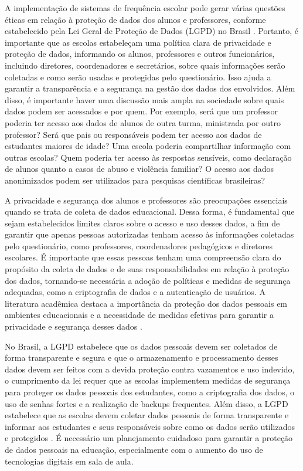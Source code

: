 A implementação de sistemas de frequência escolar pode gerar várias questões éticas em relação à proteção de dados dos alunos e professores, conforme estabelecido pela Lei Geral de Proteção de Dados (LGPD) no Brasil \cite{LGPD}. Portanto, é importante que as escolas estabeleçam uma política clara de privacidade e proteção de dados, informando os alunos, professores e outros funcionários, incluindo diretores, coordenadores e secretários, sobre quais informações serão coletadas e como serão usadas e protegidas pelo questionário. Isso ajuda a garantir a transparência e a segurança na gestão dos dados dos envolvidos. Além disso, é importante haver uma discussão mais ampla na sociedade sobre quais dados podem ser acessados e por quem. Por exemplo, será que um professor poderia ter acesso aos dados de alunos de outra turma, ministrada por outro professor? Será que pais ou responsáveis podem ter acesso aos dados de estudantes maiores de idade? Uma escola poderia compartilhar informação com outras escolas? Quem poderia ter acesso às respostas sensíveis, como declaração de alunos quanto a casos de abuso e violência familiar? O acesso aos dados anonimizados podem ser utilizados para pesquisas científicas brasileiras? 

A privacidade e segurança dos alunos e professores são preocupações essenciais quando se trata de coleta de dados educacional. Dessa forma, é fundamental que sejam estabelecidos limites claros sobre o acesso e uso desses dados, a fim de garantir que apenas pessoas autorizadas tenham acesso às informações coletadas pelo questionário, como professores, coordenadores pedagógicos e diretores escolares. É importante que essas pessoas tenham uma compreensão clara do propósito da coleta de dados e de suas responsabilidades em relação à proteção dos dados, tornando-se necessária a adoção de políticas e medidas de segurança adequadas, como a criptografia de dados e a autenticação de usuários. A literatura acadêmica destaca a importância da proteção dos dados pessoais em ambientes educacionais e a necessidade de medidas efetivas para garantir a privacidade e segurança desses dados \cite{Amo2021}. 

{No Brasil,} a LGPD estabelece que os dados pessoais devem ser coletados de forma transparente e segura e que o armazenamento e processamento desses dados devem ser feitos com a devida proteção contra vazamentos e uso indevido, o cumprimento da lei requer que as escolas implementem medidas de segurança para proteger os dados pessoais dos estudantes, como a criptografia dos dados, o uso de senhas fortes e a realização de backups frequentes. Além disso, a LGPD estabelece que as escolas devem coletar dados pessoais de forma transparente e informar aos estudantes e seus responsáveis sobre como os dados serão utilizados e protegidos \cite{Ferreira2022}. É necessário um planejamento cuidadoso para garantir a proteção de dados pessoais na educação, especialmente com o aumento do uso de tecnologias digitais em sala de aula.

